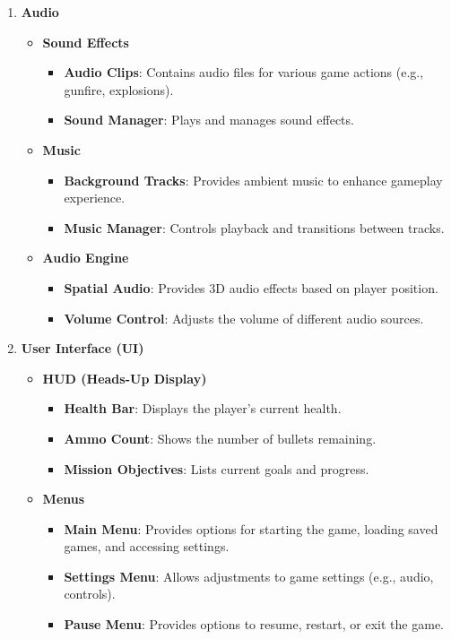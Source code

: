 \begin{enumerate}
	\item \textbf{Audio}
	\begin{itemize}
		\item \textbf{Sound Effects}
		\begin{itemize}
			\item \textbf{Audio Clips}: Contains audio files for various game actions (e.g., gunfire, explosions).
			\item \textbf{Sound Manager}: Plays and manages sound effects.
		\end{itemize}
		\item \textbf{Music}
		\begin{itemize}
			\item \textbf{Background Tracks}: Provides ambient music to enhance gameplay experience.
			\item \textbf{Music Manager}: Controls playback and transitions between tracks.
		\end{itemize}
		\item \textbf{Audio Engine}
		\begin{itemize}
			\item \textbf{Spatial Audio}: Provides 3D audio effects based on player position.
			\item \textbf{Volume Control}: Adjusts the volume of different audio sources.
		\end{itemize}
	\end{itemize}
	
	\item \textbf{User Interface (UI)}
	\begin{itemize}
		\item \textbf{HUD (Heads-Up Display)}
		\begin{itemize}
			\item \textbf{Health Bar}: Displays the player's current health.
			\item \textbf{Ammo Count}: Shows the number of bullets remaining.
			\item \textbf{Mission Objectives}: Lists current goals and progress.
		\end{itemize}
		\item \textbf{Menus}
		\begin{itemize}
			\item \textbf{Main Menu}: Provides options for starting the game, loading saved games, and accessing settings.
			\item \textbf{Settings Menu}: Allows adjustments to game settings (e.g., audio, controls).
			\item \textbf{Pause Menu}: Provides options to resume, restart, or exit the game.
		\end{itemize}
	\end{itemize}
	

\end{enumerate}

